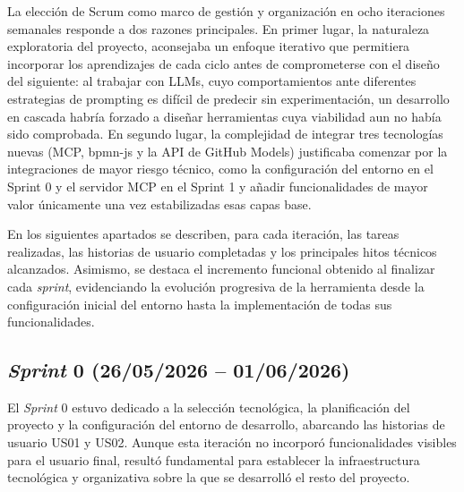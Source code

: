 La elección de Scrum como marco de gestión y organización en ocho iteraciones semanales responde a dos razones principales. En primer lugar, la naturaleza exploratoria del proyecto, aconsejaba un enfoque iterativo que permitiera incorporar los aprendizajes de cada ciclo antes de comprometerse con el diseño del siguiente: al trabajar con LLMs, cuyo comportamientos ante diferentes estrategias de prompting es difícil de predecir sin experimentación, un desarrollo en cascada habría forzado a diseñar herramientas cuya viabilidad aun no había sido comprobada. En segundo lugar, la complejidad de integrar tres tecnologías nuevas (MCP, bpmn-js y la API de GitHub Models) justificaba comenzar por la integraciones de mayor riesgo técnico, como la configuración del entorno en el Sprint 0 y el servidor MCP en el Sprint 1 y añadir funcionalidades de mayor valor únicamente una vez estabilizadas esas capas base.

En los siguientes apartados se describen, para cada iteración, las tareas realizadas, las historias de usuario completadas y los principales hitos técnicos alcanzados. Asimismo, se destaca el incremento funcional obtenido al finalizar cada \textit{sprint}, evidenciando la evolución progresiva de la herramienta desde la configuración inicial del entorno hasta la implementación de todas sus funcionalidades.


\subsection{\textit{Sprint} 0 (26/05/2026 -- 01/06/2026)}
\label{subsec:sprint0}

El \textit{Sprint} 0 estuvo dedicado a la selección tecnológica, la planificación del proyecto y la configuración del entorno de desarrollo, abarcando las historias de usuario US01 y US02. Aunque esta iteración no incorporó funcionalidades visibles para el usuario final, resultó fundamental para establecer la infraestructura tecnológica y organizativa sobre la que se desarrolló el resto del proyecto.

